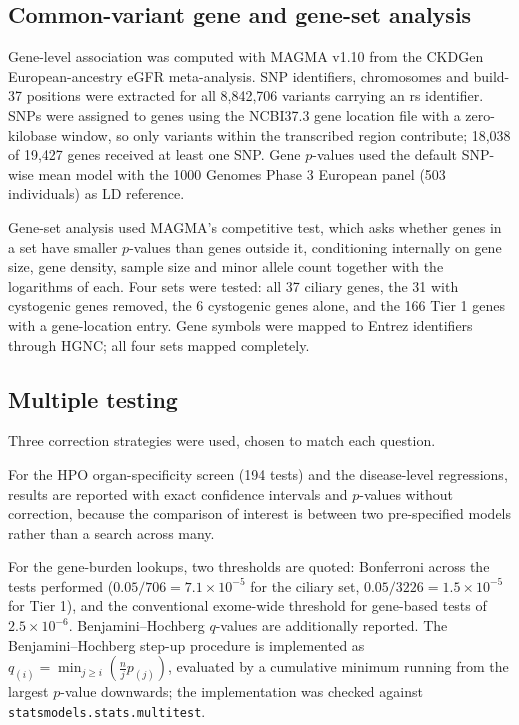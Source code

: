 \documentclass[11pt,a4paper]{article}
\begin{document}
\subsection{Common-variant gene and gene-set analysis}

Gene-level association was computed with MAGMA v1.10 \cite{deleeuw2015} from the CKDGen
European-ancestry eGFR meta-analysis. SNP identifiers, chromosomes and build-37 positions
were extracted for all 8,842,706 variants carrying an rs identifier. SNPs were assigned to
genes using the NCBI37.3 gene location file with a zero-kilobase window, so only variants
within the transcribed region contribute; 18,038 of 19,427 genes received at least one SNP.
Gene $p$-values used the default SNP-wise mean model with the 1000 Genomes Phase 3 European
panel (503 individuals) as LD reference.

Gene-set analysis used MAGMA's competitive test, which asks whether genes in a set have
smaller $p$-values than genes outside it, conditioning internally on gene size, gene
density, sample size and minor allele count together with the logarithms of each. Four sets
were tested: all 37 ciliary genes, the 31 with cystogenic genes removed, the 6 cystogenic
genes alone, and the 166 Tier 1 genes with a gene-location entry. Gene symbols were mapped
to Entrez identifiers through HGNC; all four sets mapped completely.

\subsection{Multiple testing}

Three correction strategies were used, chosen to match each question.

For the HPO organ-specificity screen (194 tests) and the disease-level regressions, results
are reported with exact confidence intervals and $p$-values without correction, because the
comparison of interest is between two pre-specified models rather than a search across many.

For the gene-burden lookups, two thresholds are quoted: Bonferroni across the tests
performed ($0.05/706 = 7.1\times10^{-5}$ for the ciliary set,
$0.05/3226 = 1.5\times10^{-5}$ for Tier 1), and the conventional exome-wide threshold for
gene-based tests of $2.5\times10^{-6}$. Benjamini--Hochberg $q$-values
\cite{benjamini1995} are additionally reported. The Benjamini--Hochberg step-up procedure is
implemented as $q_{(i)} = \min_{j \geq i}\left(\frac{n}{j}p_{(j)}\right)$, evaluated by a
cumulative minimum running from the largest $p$-value downwards; the implementation was
checked against \texttt{statsmodels.stats.multitest}.
\end{document}
